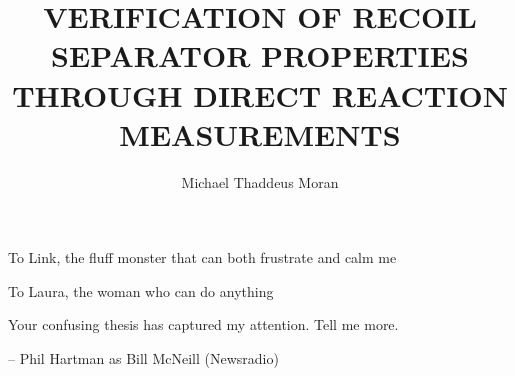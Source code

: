 \documentclass[final, twoadvisors]{nddiss2e}
\begin{document}
\frontmatter

\title{VERIFICATION OF RECOIL SEPARATOR PROPERTIES THROUGH DIRECT
       REACTION MEASUREMENTS}
\author{Michael Thaddeus Moran}

\maketitle



\tableofcontents
\listoffigures
\listoftables

\begin{dedication}
To Link, the fluff monster that can both frustrate and calm me

To Laura, the woman who can do anything
\end{dedication}

% 

\begin{dedication}
Your confusing thesis has captured my attention. Tell me more.

\---{} Phil Hartman as Bill McNeill (Newsradio)
\end{dedication}

\mainmatter







\appendix




\backmatter



\end{document}
